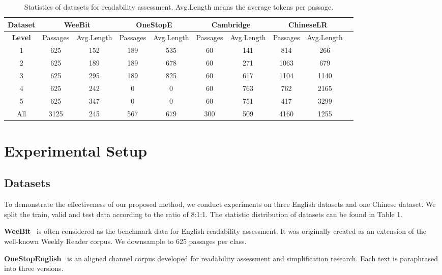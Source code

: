 \documentclass[11pt]{article}
\begin{document}
\begin{table*}[htbp]
\centering
\small
\begin{tabular}{cccccccccc}
\hline
\textbf{Dataset} & \multicolumn{2}{c}{\textbf{WeeBit}} & \multicolumn{2}{c}{\textbf{OneStopE}} & \multicolumn{2}{c}{\textbf{Cambridge}} & \multicolumn{2}{c}{\textbf{ChineseLR}} \\
\hline
\textbf{Level} & Passages    & Avg.Length    & Passages          & Avg.Length          & Passages           & Avg.Length          & Passages & \multicolumn{1}{c}{Avg.Length} \\
\hline
1 & 625 & 152 & 189 & 535 & 60 & 141 & 814 & 266 \\
2 & 625 & 189 & 189 & 678 & 60 & 271 & 1063 & 679 \\
3 & 625 & 295 & 189 & 825 & 60 & 617 & 1104 & 1140 \\
4 & 625 & 242 & 0  & 0  & 60 & 763 & 762 & 2165 \\
5 & 625 & 347 & 0  & 0  & 60 & 751 & 417 & 3299 \\
All & 3125 & 245 & 567 & 679 & 300 & 509 & 4160 & 1255 \\
\hline
\end{tabular}
\caption{Statistics of datasets for readability assessment. Avg.Length means the average tokens per passage.}
\end{table*}

\section{Experimental Setup}
\subsection{Datasets}
To demonstrate the effectiveness of our proposed method, we conduct experiments on three English datasets and one Chinese dataset. We split the train, valid and test data according to the ratio of 8:1:1. The statistic distribution of datasets can be found in Table 1.

\textbf{WeeBit}~\cite{vajjala2012improving} is often considered as the benchmark data for English readability assessment. It was originally created as an extension of the well-known Weekly Reader corpus. 
We downsample to 625 passages per class.

\textbf{OneStopEnglish}~\cite{vajjala2018onestopenglish} is an aligned channel corpus developed for readability assessment and simplification research. Each text is paraphrased into three versions.
\end{document}
